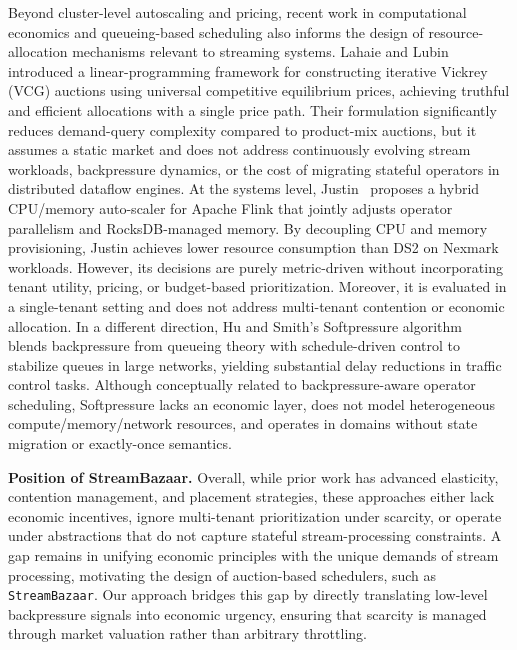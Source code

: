 \documentclass[lettersize,journal]{IEEEtran}
\begin{document}
Beyond cluster-level autoscaling and pricing, recent work in computational economics and queueing-based scheduling also informs the design of resource-allocation mechanisms relevant to streaming systems. Lahaie and Lubin~\cite{lahaie2025iterative} introduced a linear-programming framework for constructing iterative Vickrey (VCG) auctions using universal competitive equilibrium prices, achieving truthful and efficient allocations with a single price path. Their formulation significantly reduces demand-query complexity compared to product-mix auctions, but it assumes a static market and does not address continuously evolving stream workloads, backpressure dynamics, or the cost of migrating stateful operators in distributed dataflow engines.
At the systems level, Justin~\cite{schmitz2025justinhybridcpumemoryelastic} proposes a hybrid CPU/memory auto-scaler for Apache Flink that jointly adjusts operator parallelism and RocksDB-managed memory. By decoupling CPU and memory provisioning, Justin achieves lower resource consumption than DS2 on Nexmark workloads. However, its decisions are purely metric-driven without incorporating tenant utility, pricing, or budget-based prioritization. Moreover, it is evaluated in a single-tenant setting and does not address multi-tenant contention or economic allocation.
In a different direction, Hu and Smith’s Softpressure algorithm~\cite{hu2019softpressurescheduledrivenbackpressurealgorithm} blends backpressure from queueing theory with schedule-driven control to stabilize queues in large networks, yielding substantial delay reductions in traffic control tasks. Although conceptually related to backpressure-aware operator scheduling, Softpressure lacks an economic layer, does not model heterogeneous compute/memory/network resources, and operates in domains without state migration or exactly-once semantics.

\textbf{Position of StreamBazaar.} Overall, while prior work has advanced elasticity, contention management, and placement strategies, these approaches either lack economic incentives, ignore multi-tenant prioritization under scarcity, or operate under abstractions that do not capture stateful stream-processing constraints. A gap remains in unifying economic principles with the unique demands of stream processing, motivating the design of auction-based schedulers, such as \texttt{StreamBazaar}. Our approach bridges this gap by directly translating low-level backpressure signals into economic urgency, ensuring that scarcity is managed through market valuation rather than arbitrary throttling.
\end{document}

